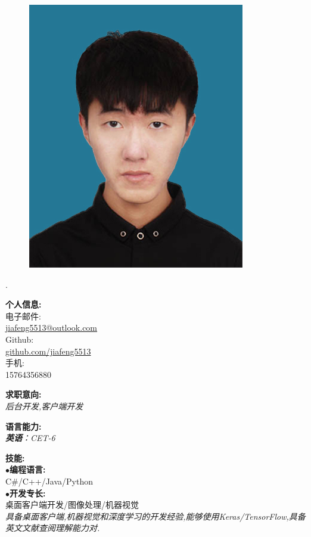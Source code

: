 \documentclass[a4paper,12pt,final]{memoir}
\newcommand{\myThemeColor}{RoyalBlue}
\newcommand{\SmallSep}{\vspace{0.9em}}
\newcommand{\CVItem}[1]
	{\textbf{\color{\myThemeColor} #1}}
\begin{document}
\begin{CJK*}{UTF8}{gbsn}%
\begin{figure}
	\hfill
	\includegraphics[width=0.8\columnwidth]{photo}
	\vspace{-7cm}
\end{figure}
\begin{flushright}\footnotesize
.\\
\vskip 6cm
    \raggedright
	\CVItem{{\large 个人信息:}}\\
	电子邮件:\\
	\href{mailto:jiafeng5513@outlook.com}{jiafeng5513@outlook.com}  \\
	Github:\\
	\href{github.com/jiafeng5513}{github.com/jiafeng5513} \\
	手机:\\
	15764356880
	\SmallSep
	\SmallSep

	\CVItem{{\large 求职意向:}}\\
	\textit{后台开发,客户端开发\\ }
	\SmallSep

	\CVItem{{\large 语言能力:}}\\
	\textit{\textbf{英语}：CET-6\\ }
	\SmallSep

	\CVItem{{\large 技能:}}\\
	$\bullet$\textbf{编程语言:}\\ C\#/C++/Java/Python\\
	$\bullet$\textbf{开发专长:}\\ 桌面客户端开发/图像处理/机器视觉 \\
	\SmallSep
	\textit{具备桌面客户端,机器视觉和深度学习的开发经验,能够使用Keras/TensorFlow,具备英文文献查阅理解能力对.}
	

\end{flushright}
\end{CJK*}
\end{document}
